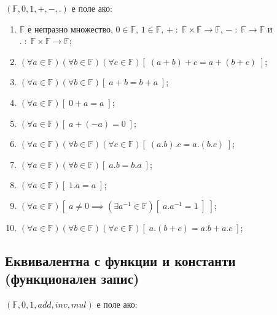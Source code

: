 \documentclass{article}[12pt]
\begin{document}
\((\mathbb{F}, 0, 1, +, -, .)\) е поле ако:

\begin{enumerate}
\item \(\mathbb{F}\) е непразно множество, \(0 \in \mathbb{F}\), \(1 \in \mathbb{F}\), \(+ \; : \; \mathbb{F} \times \mathbb{F} \to \mathbb{F}\), \(- \; : \; \mathbb{F} \to \mathbb{F}\) и \(. \; : \; \mathbb{F} \times \mathbb{F} \to \mathbb{F}\);
\item \((\forall a \in \mathbb{F})(\forall b \in \mathbb{F})(\forall c \in \mathbb{F})[\; (a + b) + c = a + (b + c) \;]\);
\item \((\forall a \in \mathbb{F})(\forall b \in \mathbb{F})[\; a + b = b + a \;]\);
\item \((\forall a \in \mathbb{F})[\; 0 + a = a \;]\);
\item \((\forall a \in \mathbb{F})[\; a + (-a) = 0 \;]\);
\item \((\forall a \in \mathbb{F})(\forall b \in \mathbb{F})(\forall c \in \mathbb{F})[\; (a . b) . c = a . (b . c) \;]\);
\item \((\forall a \in \mathbb{F})(\forall b \in \mathbb{F})[\; a . b = b . a \;]\);
\item \((\forall a \in \mathbb{F})[\; 1 . a = a \;]\);
\item \((\forall a \in \mathbb{F})[\; a \neq 0 \implies (\exists a^{-1} \in \mathbb{F})[\; a . a^{-1} = 1 \;] \;]\);
\item \((\forall a \in \mathbb{F})(\forall b \in \mathbb{F})(\forall c \in \mathbb{F})[\; a.(b + c) = a.b + a.c \;]\);
\end{enumerate}

\subsection{Еквивалентна с функции и константи (функционален запис)}

\((\mathbb{F}, 0, 1, add, inv, mul)\) е поле ако:
\end{document}

